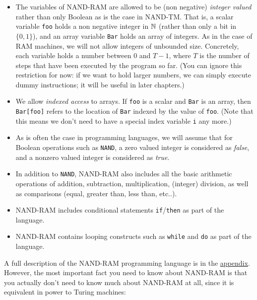 \begin{itemize}
\item
  The variables of NAND-RAM are allowed to be (non negative)
  \emph{integer valued} rather than only Boolean as is the case in
  NAND-TM. That is, a scalar variable \texttt{foo} holds a non negative
  integer in \({\mathbb{N}}\) (rather than only a bit in \(\{0,1\}\)), and an
  array variable \texttt{Bar} holds an array of integers. As in the case
  of RAM machines, we will not allow integers of unbounded size.
  Concretely, each variable holds a number between \(0\) and \(T-1\),
  where \(T\) is the number of steps that have been executed by the
  program so far. (You can ignore this restriction for now: if we want
  to hold larger numbers, we can simply execute dummy instructions; it
  will be useful in later chapters.)
\item
  We allow \emph{indexed access} to arrays. If \texttt{foo} is a scalar
  and \texttt{Bar} is an array, then \texttt{Bar[foo]} refers to the
  location of \texttt{Bar} indexed by the value of \texttt{foo}. (Note
  that this means we don't need to have a special index variable
  \texttt{i} any more.)
\item
  As is often the case in programming languages, we will assume that for
  Boolean operations such as \texttt{NAND}, a zero valued integer is
  considered as \emph{false}, and a nonzero valued integer is considered
  as \emph{true}.
\item
  In addition to \texttt{NAND}, NAND-RAM also includes all the basic
  arithmetic operations of addition, subtraction, multiplication,
  (integer) division, as well as comparisons (equal, greater than, less
  than, etc..).
\item
  NAND-RAM includes conditional statements \texttt{if}/\texttt{then} as
  part of the language.
\item
  NAND-RAM contains looping constructs such as \texttt{while} and
  \texttt{do} as part of the language.
\end{itemize}

A full description of the NAND-RAM programming language is in the
\href{http://tiny.cc/introtcsappendix}{appendix}. However, the most
important fact you need to know about NAND-RAM is that you actually
don't need to know much about NAND-RAM at all, since it is equivalent in
power to Turing machines:

\hypertarget{RAMTMequivalencethm}{}

